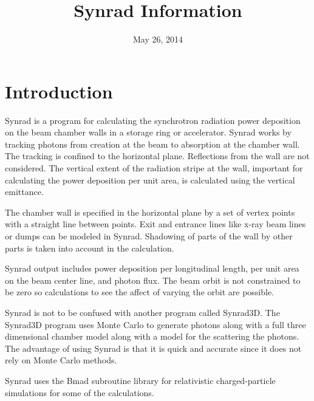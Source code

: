 \documentclass[11pt]{article}
\title{ Synrad Information}
\author{}
\date{May 26, 2014}
\begin{document}
\maketitle

\section{Introduction} 

Synrad is a program for calculating the synchrotron radiation power
deposition on the beam chamber walls in a storage ring or
accelerator. Synrad works by tracking photons from creation at the
beam to absorption at the chamber wall. The tracking is confined to
the horizontal plane.  Reflections from the wall are not considered.
The vertical extent of the radiation stripe at the wall, important for
calculating the power deposition per unit area, is calculated using
the vertical emittance.

The chamber wall is specified in the horizontal plane by a set of
vertex points with a straight line between points. Exit and entrance
lines like x-ray beam lines or dumps can be modeled in
Synrad. Shadowing of parts of the wall by other parts is taken into
account in the calculation.

Synrad output includes power deposition per longitudinal length, per
unit area on the beam center line, and photon flux. The beam orbit is
not constrained to be zero so calculations to see the affect of
varying the orbit are possible.

Synrad is not to be confused with another program called Synrad3D.
The Synrad3D program uses Monte Carlo to generate photons along with a
full three dimensional chamber model along with a model for the
scattering the photons. The advantage of using Synrad is that it is
quick and accurate since it does not rely on Monte Carlo methods.

Synrad uses the Bmad subroutine library for relativistic
charged-particle simulations\cite{b:bmad} for some of the
calculations. 

\end{document}
